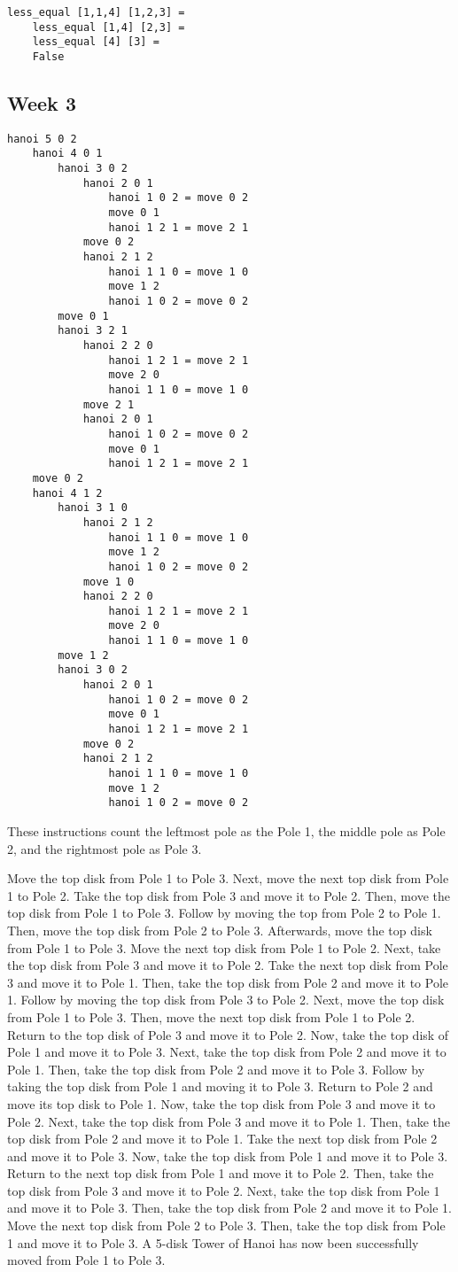 \documentclass{article}
\theoremstyle{theorem}
\theoremstyle{definition}
\theoremstyle{remark}
\begin{document}
\begin{lstlisting}
less_equal [1,1,4] [1,2,3] =
	less_equal [1,4] [2,3] =
	less_equal [4] [3] =
	False
\end{lstlisting}

\subsection{Week 3}
\begin{lstlisting}
hanoi 5 0 2
	hanoi 4 0 1
		hanoi 3 0 2
			hanoi 2 0 1
				hanoi 1 0 2 = move 0 2
				move 0 1
				hanoi 1 2 1 = move 2 1
			move 0 2
			hanoi 2 1 2
				hanoi 1 1 0 = move 1 0
				move 1 2
				hanoi 1 0 2 = move 0 2
		move 0 1
		hanoi 3 2 1
			hanoi 2 2 0
				hanoi 1 2 1 = move 2 1
				move 2 0
				hanoi 1 1 0 = move 1 0
			move 2 1
			hanoi 2 0 1
				hanoi 1 0 2 = move 0 2
				move 0 1
				hanoi 1 2 1 = move 2 1
	move 0 2
	hanoi 4 1 2
		hanoi 3 1 0
			hanoi 2 1 2
				hanoi 1 1 0 = move 1 0
				move 1 2
				hanoi 1 0 2 = move 0 2
			move 1 0
			hanoi 2 2 0
				hanoi 1 2 1 = move 2 1
				move 2 0
				hanoi 1 1 0 = move 1 0
		move 1 2
		hanoi 3 0 2
			hanoi 2 0 1
				hanoi 1 0 2 = move 0 2
				move 0 1
				hanoi 1 2 1 = move 2 1
			move 0 2
			hanoi 2 1 2
				hanoi 1 1 0 = move 1 0
				move 1 2
				hanoi 1 0 2 = move 0 2
\end{lstlisting}
%
These instructions count the leftmost pole as the Pole 1, the middle pole as Pole 2, and the rightmost pole as Pole 3.

\medskip\noindent
Move the top disk from Pole 1 to Pole 3. Next, move the next top disk from Pole 1 to Pole 2. Take the top disk from Pole 3 and move it to Pole 2. Then, move the top disk from Pole 1 to Pole 3. Follow by moving the top from Pole 2 to Pole 1. Then, move the top disk from Pole 2 to Pole 3. Afterwards, move the top disk from Pole 1 to Pole 3. Move the next top disk from Pole 1 to Pole 2. Next, take the top disk from Pole 3 and move it to Pole 2. Take the next top disk from Pole 3 and move it to Pole 1. Then, take the top disk from Pole 2 and move it to Pole 1. Follow by moving the top disk from Pole 3 to Pole 2. Next, move the top disk from Pole 1 to Pole 3. Then, move the next top disk from Pole 1 to Pole 2. Return to the top disk of Pole 3 and move it to Pole 2. Now, take the top disk of Pole 1 and move it to Pole 3. Next, take the top disk from Pole 2 and move it to Pole 1. Then, take the top disk from Pole 2 and move it to Pole 3. Follow by taking the top disk from Pole 1 and moving it to Pole 3. Return to Pole 2 and move its top disk to Pole 1. Now, take the top disk from Pole 3 and move it to Pole 2. Next, take the top disk from Pole 3 and move it to Pole 1. Then, take the top disk from Pole 2 and move it to Pole 1. Take the next top disk from Pole 2 and move it to Pole 3. Now, take the top disk from Pole 1 and move it to Pole 3. Return to the next top disk from Pole 1 and move it to Pole 2. Then, take the top disk from Pole 3 and move it to Pole 2. Next, take the top disk from Pole 1 and move it to Pole 3. Then, take the top disk from Pole 2 and move it to Pole 1. Move the next top disk from Pole 2 to Pole 3. Then, take the top disk from Pole 1 and move it to Pole 3. A 5-disk Tower of Hanoi has now been successfully moved from Pole 1 to Pole 3.
\end{document}
